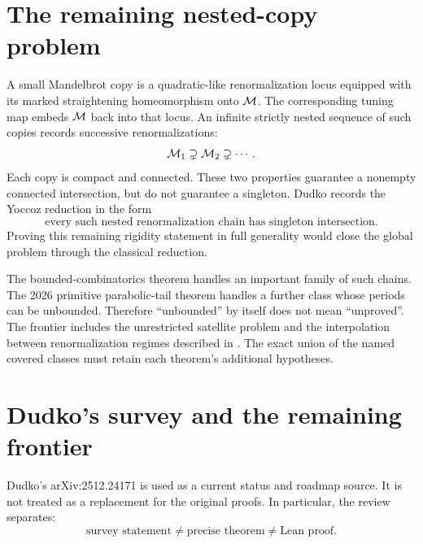 \section{The remaining nested-copy problem}

A small Mandelbrot copy is a quadratic-like renormalization locus
equipped with its marked straightening homeomorphism onto $\mathcal M$.
The corresponding tuning map embeds $\mathcal M$ back into that locus.
An infinite strictly nested sequence of such copies records
successive renormalizations:
\[
 \mathcal M_1\supsetneq\mathcal M_2\supsetneq\cdots.
\]
Each copy is compact and connected.  These two properties guarantee a
nonempty connected intersection, but do not guarantee a singleton.
Dudko records the Yoccoz reduction in the
form~\cite[Section~2, equation~(2.1)]{DudkoMLC}
\[
 \text{every such nested renormalization chain has singleton intersection}.
\]
Proving this remaining rigidity statement in full generality would close
the global problem through the classical reduction.

The bounded-combinatorics theorem handles an important family of such
chains.  The 2026 primitive parabolic-tail theorem handles a further
class whose periods can be unbounded.  Therefore ``unbounded'' by
itself does not mean ``unproved''.  The frontier includes the
unrestricted satellite problem and the interpolation between
renormalization regimes described in
\cite[Section~4]{DudkoMLC}.  The exact union of the named covered
classes must retain each theorem's additional hypotheses.


\section{Dudko's survey and the remaining frontier}

Dudko's arXiv:2512.24171 is used as a current status and roadmap source.
It is not treated as a replacement for the original proofs.  In particular,
the review separates:
\[
\text{survey statement}
\ne
\text{precise theorem}
\ne
\text{Lean proof}.
\]
